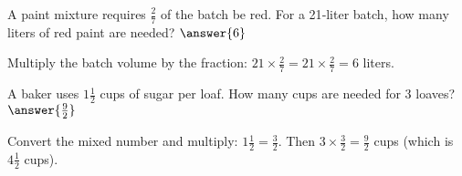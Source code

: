 \documentclass{ximera}
\begin{document}
\begin{problem}
A paint mixture requires \(\frac{2}{7}\) of the batch be red. For a 21‑liter batch, how many liters of red paint are needed? \(\answer{6}\)
\begin{feedback}
Multiply the batch volume by the fraction: \(21\times\frac{2}{7}=21\times\frac{2}{7}=6\) liters.
\end{feedback}
\end{problem}

\begin{problem}
A baker uses \(1\frac{1}{2}\) cups of sugar per loaf. How many cups are needed for 3 loaves? \(\answer{\frac{9}{2}}\)
\begin{feedback}
Convert the mixed number and multiply: \(1\frac{1}{2}=\frac{3}{2}\). Then \(3\times\frac{3}{2}=\frac{9}{2}\) cups (which is \(4\frac{1}{2}\) cups).
\end{feedback}
\end{problem}

\end{document}
